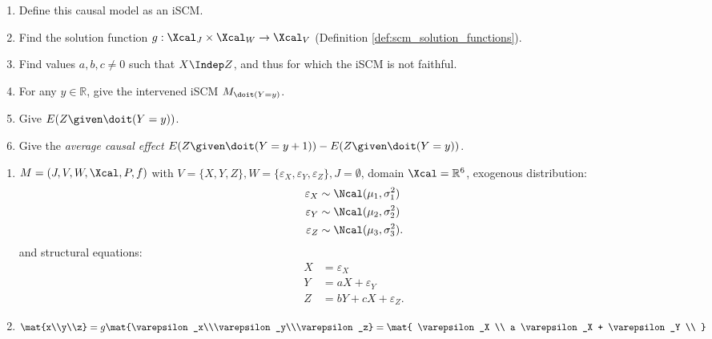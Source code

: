 \begin{enumerate}[label=9.\arabic*]
    \begin{enumerate}
        \item Define this causal model as an iSCM.
        \item Find the solution function $g: \Xcal_J\times \Xcal_W \to \Xcal_V$ (Definition \ref*{def:scm_solution_functions}).
        \item Find values $a, b, c \neq 0$ such that $X\Indep Z$, and thus for which the iSCM is not faithful.
        \item For any $y\in \mathbb{R}$, give the intervened iSCM $M_{\doit(Y=y)}$.
        \item Give $E(Z\given \doit(Y=y))$.
        \item Give the \emph{average causal effect} $E(Z\given \doit(Y=y+1)) - E(Z\given \doit(Y=y))$.
    \end{enumerate}
    \begin{ungradedsolution}
        \begin{enumerate}
            \item $M = (J, V, W, \Xcal, P, f)$ with $V = \{X, Y, Z\}, W=\{\varepsilon_X, \varepsilon_Y, \varepsilon_Z\}, J= \emptyset$, domain $\Xcal = \mathbb{R}^6$, exogenous distribution:
            \begin{align*}
                \varepsilon_X & \sim \Ncal(\mu_1, \sigma_1^2)  \\
                \varepsilon_Y & \sim \Ncal(\mu_2, \sigma_2^2)  \\
                \varepsilon_Z & \sim \Ncal(\mu_3, \sigma_3^2).
            \end{align*}
            and structural equations:
            \begin{align*}
                X & = \varepsilon_X            \\
                Y & = aX + \varepsilon_Y       \\
                Z & = bY + cX + \varepsilon_Z.
            \end{align*}
            \item
            \begin{equation*}
                \mat{x\\y\\z} = g\mat{\varepsilon_x\\\varepsilon_y\\\varepsilon_z}
                = \mat{
                    \varepsilon_X \\
                    a \varepsilon_X + \varepsilon_Y \\
}
\end{equation*}
\end{enumerate}
\end{ungradedsolution}
\end{enumerate}
